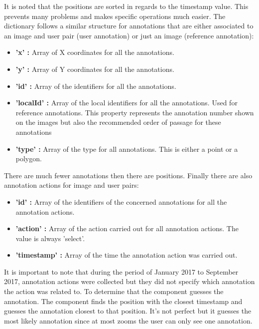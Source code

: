 \documentclass[a4paper,11pt]{report}
\numberwithin{figure}{section} %
\begin{document}
    It is noted that the positions are sorted in regards to the timestamp value.
    This prevents many problems and makes specific operations much easier.
    The dictionary follows a similar structure for annotations that are either associated to an image and user pair (user annotation) or just an image (reference annotation):
    \begin{itemize}
        \item[\textbullet] \textbf{'x' :} Array of X coordinates for all the annotations.
        \item[\textbullet] \textbf{'y' :} Array of Y coordinates for all the annotations.
        \item[\textbullet] \textbf{'id' :} Array of the identifiers for all the annotations.
        \item[\textbullet] \textbf{'localId' :} Array of the local identifiers for all the annotations.
        Used for reference annotations.
        This property represents the annotation number shown on the images but also the recommended order of passage for these annotations
        \item[\textbullet] \textbf{'type' :} Array of the type for all annotations.
        This is either a point or a polygon.
    \end{itemize}

    There are much fewer annotations then there are positions.
    Finally there are also annotation actions for image and user pairs:
    \begin{itemize}
        \item[\textbullet] \textbf{'id' :} Array of the identifiers of the concerned annotations for all the annotation actions.
        \item[\textbullet] \textbf{'action' :} Array of the action carried out for all annotation actions.
        The value is always 'select'.
        \item[\textbullet] \textbf{'timestamp' :} Array of the time the annotation action was carried out.
    \end{itemize}
    It is important to note that during the period of January 2017 to September 2017, annotation actions were collected but they did not specify which annotation the action was related to.
    To determine that the component guesses the annotation.
    The component finds the position with the closest timestamp and guesses the annotation closest to that position.
    It's not perfect but it guesses the most likely annotation since at most zooms the user can only see one annotation.\\
\end{document}
